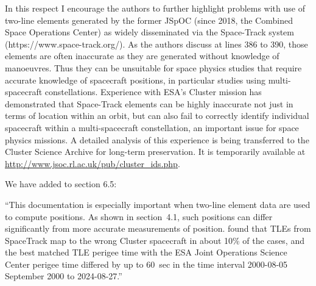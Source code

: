 \documentclass[11pt]{article}
\let\oldhref\href
\renewcommand{\href}[2]{\oldhref{#1}{\uline{#2}}}
\begin{document}
In this respect I encourage the authors to further highlight problems with use of two-line elements
generated by the former JSpOC (since 2018, the Combined Space Operations Center) as widely disseminated
via the Space-Track system (https://www.space-track.org/). As the authors discuss at lines 386 to 390, those
elements are often inaccurate as they are generated without knowledge of manoeuvres. Thus they can be
unsuitable for space physics studies that require accurate knowledge of spacecraft positions, in particular
studies using multi-spacecraft constellations. Experience with ESA’s Cluster mission has demonstrated that
Space-Track elements can be highly inaccurate not just in terms of location within an orbit, but can also fail
to correctly identify individual spacecraft within a multi-spacecraft constellation, an important issue for
space physics missions. A detailed analysis of this experience is being transferred to the Cluster Science
Archive for long-term preservation. It is temporarily available at
\href{http://www.jsoc.rl.ac.uk/pub/cluster\_ids.php}{http://www.jsoc.rl.ac.uk/pub/cluster\_ids.php}.
\\
{\color{violet}
\begin{leftbar}

We have added to section 6.5:

``This documentation is especially important when two-line element data are used to compute positions. As shown in section~4.1, such positions can differ significantly from more accurate measurements of position. \citet{Hapgood2026} found that TLEs from SpaceTrack map to the wrong Cluster spacecraft in about 10\% of the cases, and the best matched TLE perigee time with the ESA Joint Operations Science Center perigee time differed by up to 60~sec in the time interval 2000-08-05 September 2000 to 2024-08-27.''
\end{leftbar}
}

\iffalse
\vspace{1em}
\end{document}
